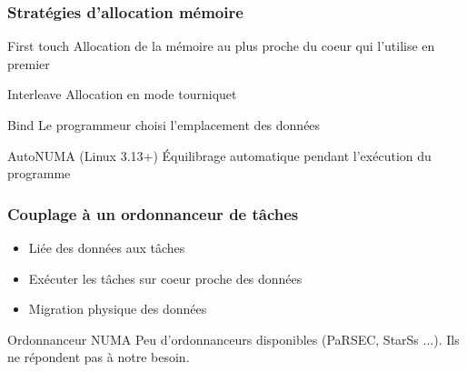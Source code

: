 \documentclass{beamer}
\begin{document}
\begin{frame}
  \frametitle{Stratégies d'allocation mémoire}

  \begin{block}{First touch}
    Allocation de la mémoire au plus proche du coeur qui l'utilise en premier
  \end{block}

  \pause

  \begin{block}{Interleave}
    Allocation en mode tourniquet
  \end{block}

  \pause

  \begin{block}{Bind}
    Le programmeur choisi l'emplacement des données
  \end{block}

  \pause

  \begin{block}{AutoNUMA (Linux 3.13+)}
    \'Equilibrage automatique pendant l'exécution du programme
  \end{block}

\end{frame}


\begin{frame}
  \frametitle{Couplage à un ordonnanceur de tâches}

  \begin{itemize}
    \item Liée des données aux tâches
    \item Exécuter les tâches sur coeur proche des données
    \item Migration physique des données
  \end{itemize}

  \pause

  \begin{alertblock}{Ordonnanceur NUMA}
    Peu d'ordonnanceurs disponibles (PaRSEC, StarSs ...). Ils ne répondent pas à notre besoin.
  \end{alertblock}

\end{frame}
\end{document}
